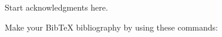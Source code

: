 \documentclass{ametsoc}
\begin{document}

%
\acknowledgments
Start acknowledgments here.

%






%
%
%
Make your BibTeX bibliography by using these commands:


\end{document}

